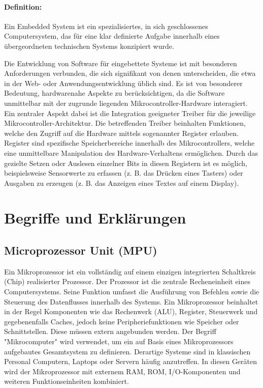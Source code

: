 \paragraph{Definition:}
Ein Embedded System ist ein spezialisiertes, in sich geschlossenes Computersystem, das für eine klar definierte Aufgabe innerhalb eines übergeordneten technischen Systems konzipiert wurde.

\vspace{6 mm}

Die Entwicklung von Software für eingebettete Systeme ist mit besonderen Anforderungen verbunden, die sich signifikant von denen unterscheiden, die etwa in der Web- oder Anwendungsentwicklung üblich sind.
Es ist von besonderer Bedeutung, hardwarenahe Aspekte zu berücksichtigen, da die Software unmittelbar mit der zugrunde liegenden Mikrocontroller-Hardware interagiert.
Ein zentraler Aspekt dabei ist die Integration geeigneter Treiber für die jeweilige Mikrocontroller-Architektur.
Die betreffenden Treiber beinhalten Funktionen, welche den Zugriff auf die Hardware mittels sogenannter Register erlauben.
Register sind spezifische Speicherbereiche innerhalb des Mikrocontrollers, welche eine unmittelbare Manipulation des Hardware-Verhaltens ermöglichen.
Durch das gezielte Setzen oder Auslesen einzelner Bits in diesen Registern ist es möglich, beispielsweise Sensorwerte zu erfassen (z. B. das Drücken eines Tasters) oder Ausgaben zu erzeugen (z. B. das Anzeigen eines Textes auf einem Display).



\section{Begriffe und Erklärungen}

\subsection*{Microprozessor Unit (MPU)}
Ein Mikroprozessor ist ein vollständig auf einem einzigen integrierten Schaltkreis (Chip) realisierter Prozessor.
Der Prozessor ist die zentrale Recheneinheit eines Computersystems.
Seine Funktion umfasst die Ausführung von Befehlen sowie die Steuerung des Datenflusses innerhalb des Systems. 
Ein Mikroprozessor beinhaltet in der Regel Komponenten wie das Rechenwerk (ALU), Register, Steuerwerk und gegebenenfalls Caches, jedoch keine Peripheriefunktionen wie Speicher oder Schnittstellen. 
Diese müssen extern angebunden werden.
Der Begriff "Mikrocomputer" wird verwendet, um ein auf Basis eines Mikroprozessors aufgebautes Gesamtsystem zu definieren. 
Derartige Systeme sind in klassischen Personal Computern, Laptops oder Servern häufig anzutreffen.
In diesen Geräten wird der Mikroprozessor mit externem RAM, ROM, I/O-Komponenten und weiteren Funktionseinheiten kombiniert.

